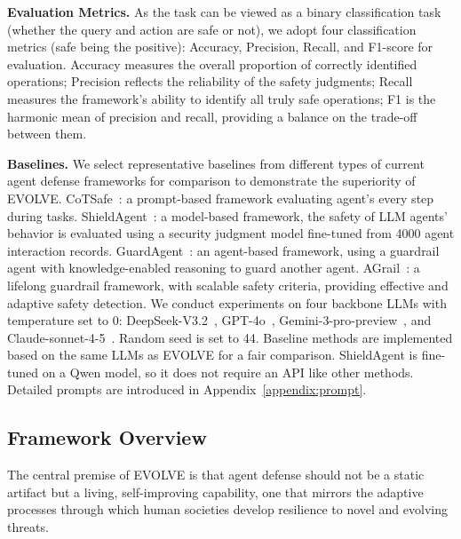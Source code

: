   \textbf{Evaluation Metrics.} As the task can be viewed as a binary classification task (whether the query and action are safe or not), we adopt four classification metrics (safe being the positive): Accuracy, Precision, Recall, and F1-score for evaluation. Accuracy measures the overall proportion of correctly identified operations; Precision reflects the reliability of the safety judgments; Recall measures the framework's ability to identify all truly safe operations; F1 is the harmonic mean of precision and recall, providing a balance on the trade-off between them.

  \textbf{Baselines.} We select representative baselines from different types of current agent defense frameworks for comparison to demonstrate the superiority of EVOLVE.  CoTSafe~\citep{yin2024safeagentbench}: a prompt-based framework evaluating agent's every step during tasks.  ShieldAgent~\citep{zhang2024asb}: a model-based framework, the safety of LLM agents' behavior is evaluated using a security judgment model fine-tuned from 4000 agent interaction records.  GuardAgent~\citep{xiang2024guardagent}: an agent-based framework, using a guardrail agent with knowledge-enabled reasoning to guard another agent.  AGrail~\citep{luo2025agrail}: a lifelong guardrail framework, with scalable safety criteria, providing effective and adaptive safety detection. We conduct experiments on four backbone LLMs with temperature set to 0: DeepSeek-V3.2~\citep{liu2024deepseek}, GPT-4o~\citep{achiam2023gpt}, Gemini-3-pro-preview~\citep{team2023gemini}, and Claude-sonnet-4-5~\citep{anthropic2025claude}. Random seed is set to 44. Baseline methods are implemented based on the same LLMs as EVOLVE for a fair comparison. ShieldAgent is fine-tuned on a Qwen model, so it does not require an API like other methods. Detailed prompts are introduced in Appendix~\ref{appendix:prompt}.

  \subsection{Framework Overview}

  The central premise of EVOLVE is that agent defense should not be a static artifact but a living, self-improving capability, one that mirrors the adaptive processes through which human societies develop resilience to novel and evolving threats.

